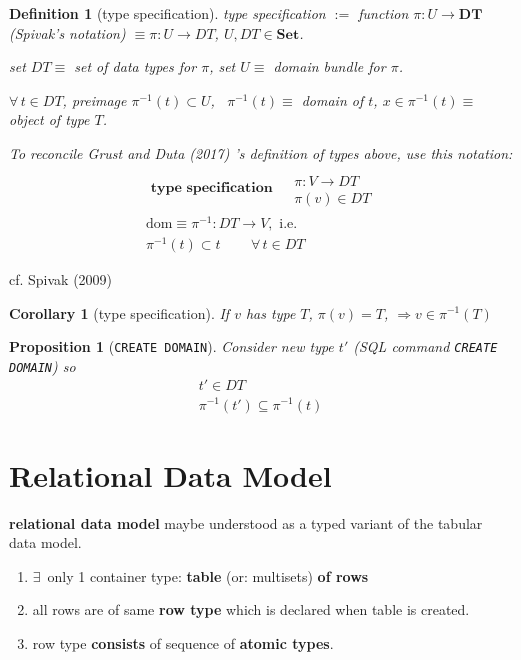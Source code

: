 \documentclass[10pt]{amsart}
\newtheorem{corollary}{Corollary}
\newtheorem{proposition}{Proposition}
\newtheorem{definition}{Definition}
\begin{document}
\begin{multicols*}{2}
\begin{definition}[type specification]
	type specification $:= $ function $\pi : U \to \mathbf{DT}$ (Spivak's notation) $ \equiv \pi : U \to DT$, $U, DT \in \textbf{Set}$.
	
	set $DT \equiv $ set of data types for $\pi$, set $U \equiv $ domain bundle for $\pi$.
	
	$\forall \, t \in DT$, preimage $\pi^{-1}(t) \subset U$, \, $\pi^{-1}(t) \equiv $ domain of $t$, $x \in \pi^{-1}(t) \equiv $ object of type $T$.

	To reconcile Grust and Duta (2017) \cite{GrDu2017}'s definition of types above, use this notation:
	\begin{equation}
	\boxed{
	\begin{gathered}
	\textbf{ type specification } \begin{aligned} & \quad \\ 
	& \pi : V \to DT \\ 
	& \pi(v) \in DT \end{aligned} \\
	\text{dom} \equiv \pi^{-1}: DT \to V, \text{ i.e. } \\
	\pi^{-1}(t) \subset t \qquad \, \forall \, t \in DT  
	\end{gathered}}
	\end{equation}
\end{definition}
	cf. Spivak (2009) \cite{Spiv2009}

\begin{corollary}[type specification]
	If $v$ has type $T$, $\pi(v) = T$, $\Longrightarrow v \in \pi^{-1}(T)$
\end{corollary}

\begin{proposition}[\texttt{CREATE DOMAIN}]
	Consider new type $t'$ (SQL command \texttt{CREATE DOMAIN}) so 
	\begin{equation}
	\begin{gathered}
	t' \in DT \\
	\pi^{-1}(t') \subseteq \pi^{-1}(t)
	\end{gathered}
	\end{equation}
\end{proposition}


\section{Relational Data Model}

	\textbf{relational data model} maybe understood as a typed variant of the tabular data model. 
	\begin{enumerate}
		\item $\exists \, $ only 1 container type: \textbf{table} (or: multisets) \textbf{ of rows}
		\item all rows are of same \textbf{row type} which is declared when table is created.
		\item row type \textbf{consists} of sequence of \textbf{atomic types}.
	\end{enumerate}


\end{multicols*}
\end{document}
